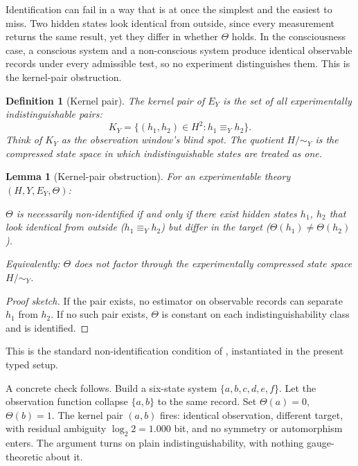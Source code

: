 \documentclass[11pt]{article}
\newtheorem{lemma}{Lemma}
\newtheorem{definition}{Definition}
\begin{document}
Identification can fail in a way that is at once the simplest and the easiest to
miss. Two hidden states look identical from outside, since every measurement
returns the same result, yet they differ in whether $\Theta$ holds. In the
consciousness case, a conscious system and a non-conscious system produce
identical observable records under every admissible test, so no experiment
distinguishes them. This is the kernel-pair obstruction.

\begin{definition}[Kernel pair]
\label{def:kernelpair}
The \emph{kernel pair} of $E_Y$ is the set of all experimentally
indistinguishable pairs:
\[
K_Y = \{(h_1, h_2) \in H^2 : h_1 \equiv_Y h_2\}.
\]
Think of $K_Y$ as the observation window's blind spot.
The quotient $H/\!\sim_Y$ is the compressed state space in which
indistinguishable states are treated as one.
\end{definition}

\begin{lemma}[Kernel-pair obstruction]
\label{thm:kernelpair}
For an experimentable theory $(H, Y, E_Y, \Theta)$:

\medskip
\noindent\textit{$\Theta$ is necessarily non-identified if and only if there
exist hidden states $h_1$, $h_2$ that look identical from outside
($h_1 \equiv_Y h_2$) but differ in the target
($\Theta(h_1) \neq \Theta(h_2)$).}

\medskip
\noindent Equivalently: $\Theta$ does not factor through the experimentally
compressed state space $H/\!\sim_Y$.
\end{lemma}

\begin{proof}[Proof sketch]
If the pair exists, no estimator on observable records can separate $h_1$
from $h_2$.
If no such pair exists, $\Theta$ is constant on each indistinguishability
class and is identified.
\end{proof}

This is the standard non-identification condition of \citet{pearl2009},
instantiated in the present typed setup.

A concrete check follows. Build a six-state system
$\{a, b, c, d, e, f\}$.
Let the observation function collapse $\{a, b\}$ to the same record.
Set $\Theta(a) = 0$, $\Theta(b) = 1$.
The kernel pair $(a,b)$ fires: identical observation, different target, with
residual ambiguity $\log_2 2 = 1.000$ bit, and no symmetry or automorphism
enters. The argument turns on plain indistinguishability, with nothing
gauge-theoretic about it.
\end{document}
